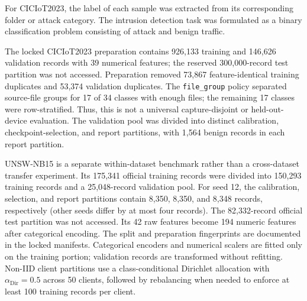 \documentclass[5p,times,numafflabel]{elsarticle}
\begin{document}
	For CICIoT2023, the label of each sample was extracted from its
	corresponding folder or attack category. The intrusion detection task
	was formulated as a binary classification problem consisting of
	attack and benign traffic.
	
	
	The locked CICIoT2023 preparation contains 926,133 training and
	146,626 validation records with 39 numerical features; the reserved
	300,000-record test partition was not accessed. Preparation removed
	73,867 feature-identical training duplicates and 53,374 validation
	duplicates. The \texttt{file\_group} policy separated source-file
	groups for 17 of 34 classes with enough files; the remaining 17
	classes were row-stratified. Thus, this is not a universal
	capture-disjoint or held-out-device evaluation. The validation pool
	was divided into distinct calibration, checkpoint-selection, and
	report partitions, with 1,564 benign records in each report partition.
	
	UNSW-NB15 is a separate within-dataset benchmark rather than a
	cross-dataset transfer experiment. Its 175,341 official training
	records were divided into 150,293 training records and a 25,048-record
	validation pool. For seed 12, the calibration, selection, and report
	partitions contain 8,350, 8,350, and 8,348 records, respectively
	(other seeds differ by at most four records). The 82,332-record
	official test partition was not accessed. Its 42 raw features become
194 numeric features after categorical encoding. The split and preparation fingerprints are documented in the locked
	manifests. Categorical encoders and numerical scalers are fitted
	only on the training portion; validation records are transformed
	without refitting. Non-IID client partitions use a class-conditional
	Dirichlet allocation with $\alpha_{\mathrm{Dir}}=0.5$ across 50
	clients, followed by rebalancing when needed to enforce at least
	100 training records per client.
	
\end{document}
